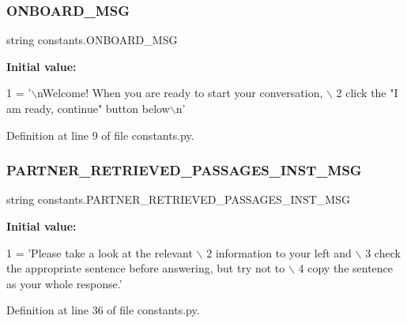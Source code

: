 \subsubsection{\texorpdfstring{O\+N\+B\+O\+A\+R\+D\+\_\+\+M\+SG}{ONBOARD\_MSG}}
{\footnotesize\ttfamily string constants.\+O\+N\+B\+O\+A\+R\+D\+\_\+\+M\+SG}

{\bfseries Initial value\+:}
\begin{DoxyCode}
1 =  \textcolor{stringliteral}{'\(\backslash\)nWelcome! When you are ready to start your conversation, \(\backslash\)}
2 \textcolor{stringliteral}{        click the "I am ready, continue" button below\(\backslash\)n'}
\end{DoxyCode}


Definition at line 9 of file constants.\+py.

\mbox{\label{namespaceconstants_a09ce3b3e085c08c15238232f9d6197e7}} 
\subsubsection{\texorpdfstring{P\+A\+R\+T\+N\+E\+R\+\_\+\+R\+E\+T\+R\+I\+E\+V\+E\+D\+\_\+\+P\+A\+S\+S\+A\+G\+E\+S\+\_\+\+I\+N\+S\+T\+\_\+\+M\+SG}{PARTNER\_RETRIEVED\_PASSAGES\_INST\_MSG}}
{\footnotesize\ttfamily string constants.\+P\+A\+R\+T\+N\+E\+R\+\_\+\+R\+E\+T\+R\+I\+E\+V\+E\+D\+\_\+\+P\+A\+S\+S\+A\+G\+E\+S\+\_\+\+I\+N\+S\+T\+\_\+\+M\+SG}

{\bfseries Initial value\+:}
\begin{DoxyCode}
1 =  \textcolor{stringliteral}{'Please take a look at the relevant \(\backslash\)}
2 \textcolor{stringliteral}{        information to your left and \(\backslash\)}
3 \textcolor{stringliteral}{        check the appropriate sentence before answering, but try not to \(\backslash\)}
4 \textcolor{stringliteral}{        copy the sentence as your whole response.'}
\end{DoxyCode}


Definition at line 36 of file constants.\+py.

